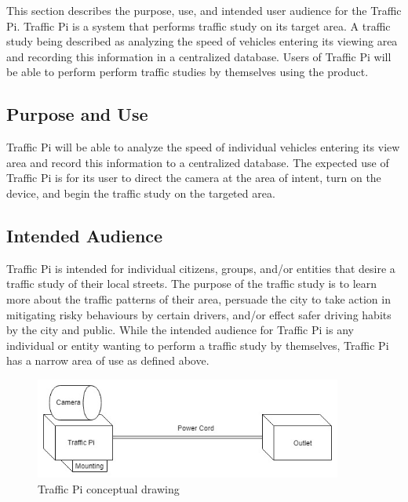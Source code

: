 This section describes the purpose, use, and intended user audience for the Traffic Pi. Traffic Pi is a system that performs traffic study on its target area. A traffic study being described as analyzing the speed of vehicles entering its viewing area and recording this information in a centralized database. Users of Traffic Pi will be able to perform perform traffic studies by themselves using the product.

\subsection{Purpose and Use}
Traffic Pi will be able to analyze the speed of individual vehicles entering its view area and record this information to a centralized database. The expected use of Traffic Pi is for its user to direct the camera at the area of intent, turn on the device, and begin the traffic study on the targeted area.

\subsection{Intended Audience}
Traffic Pi is intended for individual citizens, groups, and/or entities that desire a traffic study of their local streets. The purpose of the traffic study is to learn more about the traffic patterns of their area, persuade the city to take action in mitigating risky behaviours by certain drivers, and/or effect safer driving habits by the city and public. While the intended audience for Traffic Pi is any individual or entity wanting to perform a traffic study by themselves, Traffic Pi has a narrow area of use as defined above.

\begin{figure}[h!]
	\centering
   	\includegraphics[width=0.90\textwidth]{images/Conceptual_Drawing.jpg}
    \caption{Traffic Pi conceptual drawing}
\end{figure}
